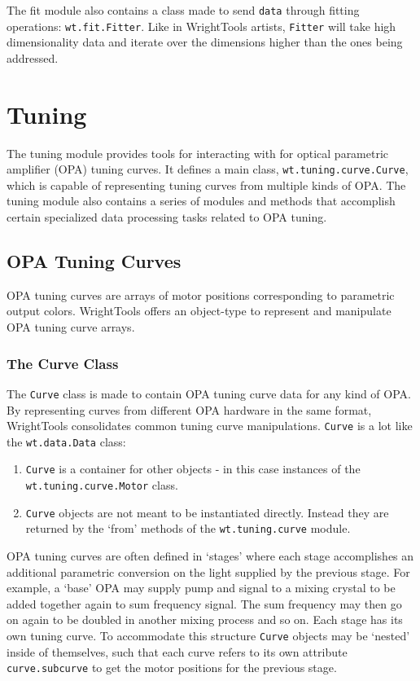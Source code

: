 \documentclass[11pt]{article}
\begin{document}
	The fit module also contains a class made to send \texttt{data} through fitting operations: \texttt{wt.fit.Fitter}. Like in WrightTools artists, \texttt{Fitter} will take high dimensionality data and iterate over the dimensions higher than the ones being addressed.

\pagebreak
\section{Tuning}

The tuning module provides tools for interacting with for optical parametric amplifier (OPA) tuning curves. It defines a main class, \texttt{wt.tuning.curve.Curve}, which is capable of representing tuning curves from multiple kinds of OPA. The tuning module also contains a series of modules and methods that accomplish certain specialized data processing tasks related to OPA tuning.

\subsection{OPA Tuning Curves}

OPA tuning curves are arrays of motor positions corresponding to parametric output colors. WrightTools offers an object-type to represent and manipulate OPA tuning curve arrays.

\subsubsection{The Curve Class}

The \texttt{Curve} class is made to contain OPA tuning curve data for any kind of OPA. By representing curves from different OPA hardware in the same format, WrightTools consolidates common tuning curve manipulations. \texttt{Curve} is a lot like the \texttt{wt.data.Data} class:

\begin{enumerate}
	\item \texttt{Curve} is a container for other objects - in this case instances of the \texttt{wt.tuning.curve.Motor} class. 
	\item \texttt{Curve} objects are not meant to be instantiated directly. Instead they are returned by the `from' methods of the \texttt{wt.tuning.curve} module. 
\end{enumerate}

OPA tuning curves are often defined in `stages' where each stage accomplishes an additional parametric conversion on the light supplied by the previous stage. For example, a `base' OPA may supply pump and signal to a mixing crystal to be added together again to sum frequency signal. The sum frequency may then go on again to be doubled in another mixing process and so on. Each stage has its own tuning curve. To accommodate this structure \texttt{Curve} objects may be `nested' inside of themselves, such that each curve refers to its own attribute \texttt{curve.subcurve} to get the motor positions for the previous stage.
\end{document}
